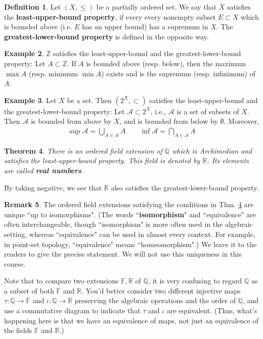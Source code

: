 \documentclass[12pt,b5paper,notitlepage]{article}
\theoremstyle{definition}
\newtheorem{df}{Definition}[section]
\newtheorem{eg}[df]{Example}
\newtheorem{rem}[df]{Remark}
\theoremstyle{plain}
\newtheorem{thm}[df]{Theorem}
\newcommand{\scr}{\mathscr}
\newcommand{\Zbb}{\mathbb Z}
\newcommand{\Qbb}{\mathbb Q}
\newcommand{\Rbb}{\mathbb R}
\newcommand{\Fbb}{\mathbb F}
\numberwithin{equation}{section}
\begin{document}
\begin{df}
Let $(X,\leq)$ be a partially ordered set. We say that $X$ satisfies the \textbf{least-upper-bound property}, if every every nonempty subset $E\subset X$ which is bounded above (i.e. $E$ has an upper bound) has a supremum in $X$. The \textbf{greatest-lower-bound property} is defined in the opposite way.
\end{df}

\begin{eg}
$\Zbb$ satisfies the least-upper-bound and the greatest-lower-bound property: Let $A\subset \Zbb$. If $A$ is bounded above (resp. below), then the maximum $\max A$ (resp. minimum $\min A$) exists and is the supremum (resp. infinimum) of $A$.
\end{eg}

\begin{eg}
Let $X$ be a set. Then $(2^X,\subset)$ satisfies the least-upper-bound and the greatest-lower-bound property: Let $\scr A\subset 2^X$, i.e., $\scr A$ is a set of subsets of $X$. Then $\scr A$ is bounded from above by $X$, and is bounded from below by $\emptyset$. Moreover,
\begin{align*}
\sup\scr A=\bigcup_{A\in\scr A}A\qquad \inf\scr A=\bigcap_{A\in\scr A}A
\end{align*}
\end{eg}



\begin{thm}\label{lb3}
There is an ordered field extension of $\Qbb$ which is Archimedian and satisfies the least-upper-bound property. This field is denoted by  $\Rbb$. Its elements are called  \textbf{real numbers}.
\end{thm}

By taking negative, we see that $\Rbb$ also satisfies the greatest-lower-bound property.


\begin{rem}
The ordered field extensions satisfying the conditions in Thm. \ref{lb3} are unique ``up to isomorphisms". (The words ``\textbf{isomorphism}"  and ``equivalence" are often interchangeable, though ``isomorphism" is more often used in the algebraic setting, whereas ``equivalence" can be used in almost every context. For example, in point-set topology, ``equivalence" means ``homeomorphism".) We leave it to the readers to give the precise statement. We will not use this uniqueness in this course. 

Note that to compare two extensions $\Fbb,\Rbb$ of $\Qbb$, it is very confusing to regard $\Qbb$ as a subset of both $\Fbb$ and $\Rbb$. You'd better consider two different injective maps $\tau:\Qbb\rightarrow \Fbb$ and $\iota:\Qbb\rightarrow\Rbb$ preserving the algebraic operations and the order of $\Qbb$, and use a commutative diagram to indicate that $\tau$ and $\iota$ are equivalent. (Thus, what's happening here is that we have an equivalence of maps, not just an equivalence of the fields $\Fbb$ and $\Rbb$.) \hfill\qedsymbol
\end{rem}
\end{document}
